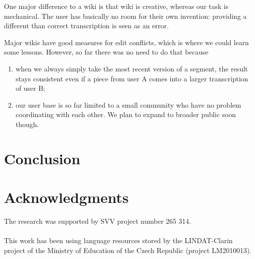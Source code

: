 \documentclass{llncs}
\begin{document}
One major difference to a wiki is that wiki is creative, whereas our task is
mechanical. The user has basically no room for their own invention: providing a
different than correct transcription is seen as an error.

Major wikis have good measures for edit conflicts, which is where we could learn
some lessons. However, so far there was no need to do that because
\begin{enumerate}
\item{when we always simply take the most recent version
of a segment, the result stays consistent even if a piece from user A comes into
a larger transcription of user B;}
\item{our user base is so far limited to a small community who have no problem
coordinating with each other. We plan to expand to broader public soon though.}
\end{enumerate}







\section{Conclusion}

\section*{Acknowledgments}

The research was supported by SVV project number 265 314.\\
\\
This work has been using language resources stored
by the LINDAT-Clarin project of the Ministry of
Education of the Czech Republic (project LM2010013).
%


\end{document}
